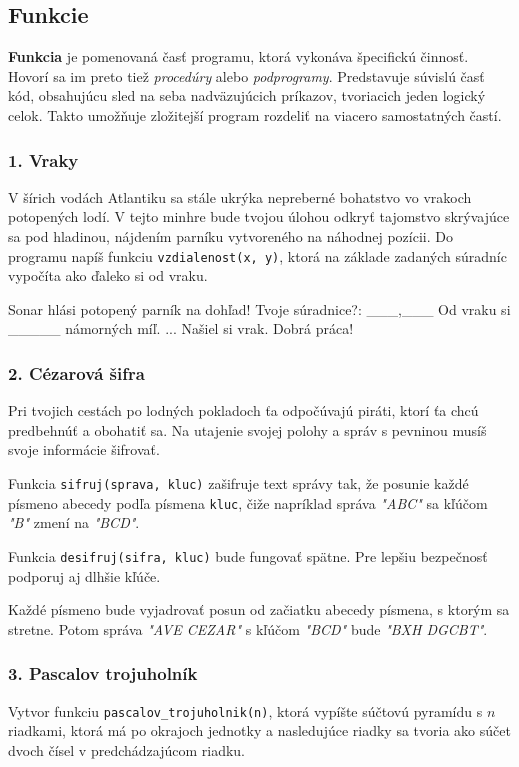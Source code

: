 
\subsection{Funkcie}
\textbf{Funkcia} je pomenovaná časť programu, ktorá vykonáva špecifickú činnosť. Hovorí sa im preto tiež \textit{procedúry} alebo \textit{podprogramy}. Predstavuje súvislú časť kód, obsahujúcu sled na seba nadväzujúcich príkazov, tvoriacich jeden logický celok.  Takto umožňuje zložitejší program rozdeliť na viacero samostatných častí.


\subsubsection*{1. Vraky}
V šírich vodách Atlantiku sa stále ukrýka nepreberné bohatstvo vo vrakoch potopených lodí. V tejto minhre bude tvojou úlohou odkryť tajomstvo skrývajúce sa pod hladinou, nájdením parníku vytvoreného na náhodnej pozícii. Do programu napíš funkciu \verb|vzdialenost(x, y)|, ktorá na základe zadaných súradníc vypočíta ako ďaleko si od vraku.

\begin{code}
Sonar hlási potopený parník na dohľad!
Tvoje súradnice?: ___,___
Od vraku si _____ námorných míľ.
...
Našiel si vrak. Dobrá práca!
\end{code}


\subsubsection*{2. Cézarová šifra}
Pri tvojich cestách po lodných pokladoch ťa odpočúvajú piráti, ktorí ťa chcú predbehnúť a obohatiť sa. Na utajenie svojej polohy a správ s pevninou musíš svoje informácie šifrovať. 

Funkcia \verb|sifruj(sprava, kluc)| zašifruje text správy tak, že posunie každé písmeno abecedy podľa písmena \verb|kluc|, čiže napríklad správa \emph{"ABC"} sa kľúčom \emph{"B"} zmení na \emph{"BCD"}. 

Funkcia \verb|desifruj(sifra, kluc)| bude fungovať spätne.  Pre lepšiu bezpečnosť podporuj aj dlhšie kľúče. 

Každé písmeno bude vyjadrovať posun od začiatku abecedy písmena, s ktorým sa stretne. Potom správa \emph{"AVE CEZAR"} s kľúčom \emph{"BCD"} bude \emph{"BXH DGCBT"}.


\subsubsection*{3. Pascalov trojuholník}
Vytvor funkciu \verb|pascalov_trojuholnik(n)|, ktorá vypíšte súčtovú pyramídu s $n$ riadkami, ktorá má po okrajoch jednotky a nasledujúce riadky sa tvoria ako súčet dvoch čísel v predchádzajúcom riadku.

